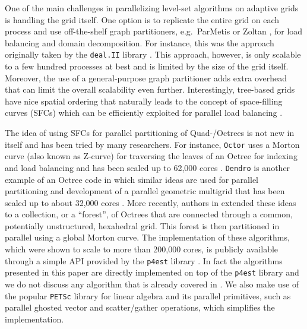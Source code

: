 One of the main challenges in parallelizing level-set algorithms on adaptive grids is handling the grid itself. One option is to replicate the entire grid on each process and use off-the-shelf graph partitioners, e.g.\ ParMetis \cite{Karypis;Kumar:98:A-parallel-algorithm} or Zoltan \cite{Boman;Catalyurek;Chevalier;etal:12:The-Zoltan-and-Isorr}, for load balancing and domain decomposition. For instance, this was the approach originally taken by the \texttt{deal.II} library \cite{Bangerth;Hartmann;Kanschat:07:deal.II----a-General}. This approach, however, is only scalable to a few hundred processes at best and is limited by the size of the grid itself. Moreover, the use of a general-purpose graph partitioner adds extra overhead that can limit the overall scalability even further. Interestingly, tree-based grids have nice spatial ordering that naturally leads to the concept of space-filling curves (SFCs) which can be efficiently exploited for parallel load balancing \cite{Aluru;Sevilgen:97:Parallel-domain-deco,Campbell;Devine;Flaherty;etal:03:Dynamic-octree-load-}.

The idea of using SFCs for parallel partitioning of Quad-/Octrees is not new in itself and has been tried by many researchers. For instance, \texttt{Octor} \cite{Tu;OHallaron;Ghattas:05:Scalable-parallel-oc} uses a Morton curve (also known as Z-curve) for traversing the leaves of an Octree for indexing and load balancing and has been scaled up to 62,000 cores \cite{Burstedde;Ghattas;Gurnis;etal:08:Scalable-adaptive-ma}. \texttt{Dendro} \cite{Sampath;Adavani;Sundar;etal:08:Dendro:-parallel-alg} is another example of an Octree code in which similar ideas are used for parallel partitioning and development of a parallel geometric multigrid that has been scaled up to about 32,000 cores \cite{Sampath;Biros:10:A-parallel-geometric}. More recently, authors in \cite{Burstedde;Wilcox;Ghattas:11:p4est:-Scalable-Algo} extended these ideas to a collection, or a ``forest'', of Octrees that are connected through a common, potentially unstructured, hexahedral grid. This forest is then partitioned in parallel using a global Morton curve. The implementation of these algorithms, which were shown to scale to more than 200,000 cores, is publicly available through a simple API provided by the \texttt{p4est} library \cite{p4est-github}. In fact the algorithms presented in this paper are directly implemented on top of the \texttt{p4est} library and we do not discuss any algorithm that is already covered in \cite{Burstedde;Wilcox;Ghattas:11:p4est:-Scalable-Algo}. We also make use of the popular \texttt{PETSc} \cite{Balay;Abhyankar;Adams;etal:14:PETSc-Web-page} library for linear algebra and its parallel primitives, such as parallel ghosted vector and scatter/gather operations, which simplifies the implementation. 

